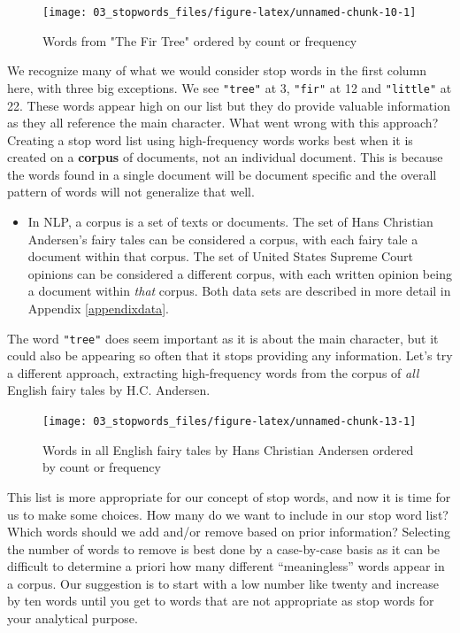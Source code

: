\documentclass[
]{krantz}
\newenvironment{rmdblock}[1]
  {\begin{shaded*}
  \begin{itemize}[left = -1cm, labelsep = 1cm]
  \renewcommand{\labelitemi}{
    \raisebox{-.7\height}[0pt][0pt]{
      {\setkeys{Gin}{width=3em,keepaspectratio}\texttt{[image: images/\#1]}}
    }
  }
 
  \item
  }
  {
  \end{itemize}
  \end{shaded*}
  }
\newenvironment{rmdnote}
  {\begin{rmdblock}{note}}
  {\end{rmdblock}}
\begin{document}
\begin{figure}

{\centering \texttt{[image: 03\_stopwords\_files/figure-latex/unnamed-chunk-10-1]} 

}

\caption{Words from "The Fir Tree" ordered by count or frequency}\label{fig:unnamed-chunk-10}
\end{figure}

We recognize many of what we would consider stop words in the first column here, with three big exceptions. We see \texttt{"tree"} at 3, \texttt{"fir"} at 12 and \texttt{"little"} at 22. These words appear high on our list but they do provide valuable information as they all reference the main character. What went wrong with this approach? Creating a stop word list using high-frequency words works best when it is created on a \textbf{corpus} of documents, not an individual document. This is because the words found in a single document will be document specific and the overall pattern of words will not generalize that well.

\begin{rmdnote}
In NLP, a corpus is a set of texts or documents. The set of Hans Christian Andersen's fairy tales can be considered a corpus, with each fairy tale a document within that corpus. The set of United States Supreme Court opinions can be considered a different corpus, with each written opinion being a document within \emph{that} corpus. Both data sets are described in more detail in Appendix \ref{appendixdata}.
\end{rmdnote}

The word \texttt{"tree"} does seem important as it is about the main character, but it could also be appearing so often that it stops providing any information. Let's try a different approach, extracting high-frequency words from the corpus of \emph{all} English fairy tales by H.C. Andersen.

\begin{figure}

{\centering \texttt{[image: 03\_stopwords\_files/figure-latex/unnamed-chunk-13-1]} 

}

\caption{Words in all English fairy tales by Hans Christian Andersen ordered by count or frequency}\label{fig:unnamed-chunk-13}
\end{figure}

This list is more appropriate for our concept of stop words, and now it is time for us to make some choices. How many do we want to include in our stop word list? Which words should we add and/or remove based on prior information? Selecting the number of words to remove is best done by a case-by-case basis as it can be difficult to determine a priori how many different ``meaningless'' words appear in a corpus. Our suggestion is to start with a low number like twenty and increase by ten words until you get to words that are not appropriate as stop words for your analytical purpose.
\end{document}
